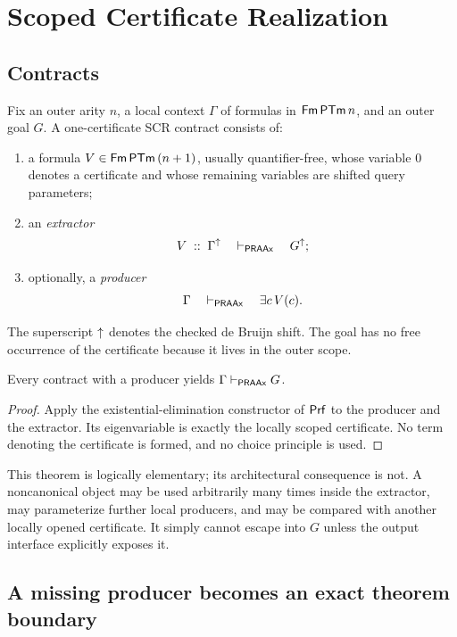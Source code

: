 \section{Scoped Certificate Realization}
\label{sec:scr}

\subsection{Contracts}

Fix an outer arity \(n\), a local context \(\Gamma\) of formulas in
\(\mathsf{Fm}\,\mathsf{PTm}\,n\), and an outer goal \(G\).  A one-certificate SCR contract
consists of:
\begin{enumerate}[label=(C\arabic*)]
\item a formula \(V\in\mathsf{Fm}\,\mathsf{PTm}\,(n+1)\), usually quantifier-free, whose
      variable \(0\) denotes a certificate and whose remaining variables are
      shifted query parameters;
\item an \emph{extractor}
\[
       V\;::\;\Gamma^{\mathord{\uparrow}}\quad\mathrel{\vdash_{\mathsf{PRAAx}}}\quad G^{\mathord{\uparrow}};
\]
\item optionally, a \emph{producer}
\[
       \Gamma\quad\mathrel{\vdash_{\mathsf{PRAAx}}}\quad \exists c\,V(c).
\]
\end{enumerate}
The superscript \(\mathord{\uparrow}\) denotes the checked de Bruijn shift.  The goal has no
free occurrence of the certificate because it lives in the outer scope.

\begin{theorem}
\label{thm:seal}
Every contract with a producer yields \(\Gamma\mathrel{\vdash_{\mathsf{PRAAx}}} G\).
\end{theorem}

\begin{proof}
Apply the existential-elimination constructor of \(\mathsf{Prf}\) to the producer and
the extractor.  Its eigenvariable is exactly the locally scoped certificate.
No term denoting the certificate is formed, and no choice principle is used.
\end{proof}

This theorem is logically elementary; its architectural consequence is not.
A noncanonical object may be used arbitrarily many times inside the extractor,
may parameterize further local producers, and may be compared with another
locally opened certificate.  It simply cannot escape into \(G\) unless the
output interface explicitly exposes it.

\subsection{A missing producer becomes an exact theorem boundary}

